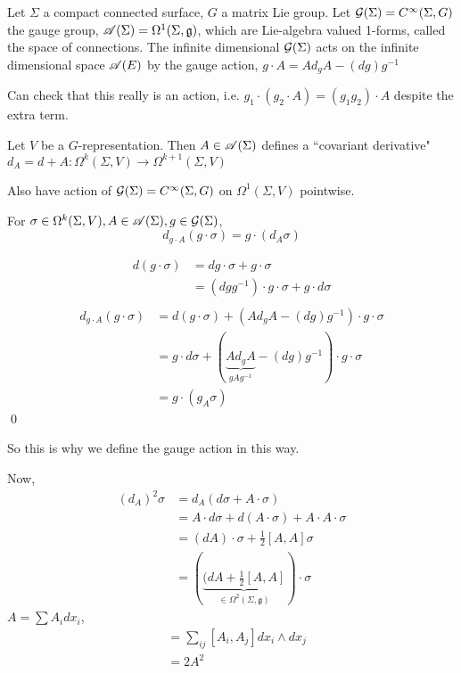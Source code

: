 \documentclass[x11names,reqno,14pt]{extarticle}
\newcommand{\mk}[1]{\mathfrak{#1}}
\newcommand{\g}{\mk{g}}
\begin{document}
Let $\Sigma$ a compact connected surface, $G$ a matrix Lie group. Let $\mathcal{G}(\Sigma) = C^\infty(\Sigma, G)$ the gauge group, $\ms{A}(\Sigma) = \Omega^1(\Sigma,\g)$, which are Lie-algebra valued 1-forms, called the space of connections. The infinite dimensional $\mathcal{G}(\Sigma)$ acts on the infinite dimensional space $\mathscr{A}(E)$ by the gauge action, $g\cdot A = Ad_gA-(dg)g^{-1}$

Can check that this really is an action, i.e. $g_1\cdot(g_2\cdot A) = (g_1g_2)\cdot A$ despite the extra term. 

Let $V$ be a $G$-representation. Then $A \in \mathscr{A}(\Sigma)$ defines a ``covariant derivative" $d_A = d + A:\Omega^k(\Sigma,V) \to \Omega^{k+1}(\Sigma,V)$

Also have action of $\mathcal{G}(\Sigma) = C^\infty(\Sigma,G)$ on $\Omega^1(\Sigma,V)$ pointwise. 

\prop

For $\sigma\in\Omega^k(\Sigma,V), A \in \mathscr{A}(\Sigma), g \in \mathcal{G}(\Sigma)$, 
\[
d_{g\cdot A}(g\cdot\sigma) = g\cdot(d_A\sigma)
\]

\proof

\begin{align*}
d(g\cdot\sigma) & = dg\cdot\sigma + g\cdot\sigma \\
& = (dgg^{-1})\cdot g\cdot\sigma + g\cdot d\sigma \\
\end{align*}
\begin{align*}
d_{g\cdot A}(g\cdot \sigma) & = d(g\cdot\sigma) + (Ad_gA - (dg)g^{-1})\cdot g\cdot\sigma \\
& = g\cdot d\sigma + (\underbrace{Ad_gA}_{gAg^{-1}} - (dg)g^{-1})\cdot g\cdot\sigma \\
& = g\cdot(g_A\sigma)
\end{align*}
\qed

So this is why we define the gauge action in this way. 

Now, 
\begin{align*}
(d_A)^2\sigma & = d_A(d\sigma + A\cdot\sigma) \\
& = A\cdot d\sigma + d(A\cdot \sigma) + A\cdot A\cdot\sigma \\
& = (dA)\cdot\sigma + \frac12[A,A]\sigma \\
& = (\underbrace{(dA + \frac12[A,A]}_{\in\Omega^2(\Sigma,\g)})\cdot\sigma
\end{align*}
$A = \sum A_idx_i$, 
\begin{align*}
[A,A] & = \sum_{ij}[A_i,A_j]dx_i\wedge dx_j  \\
& = 2A^2
\end{align*}
\end{document}
